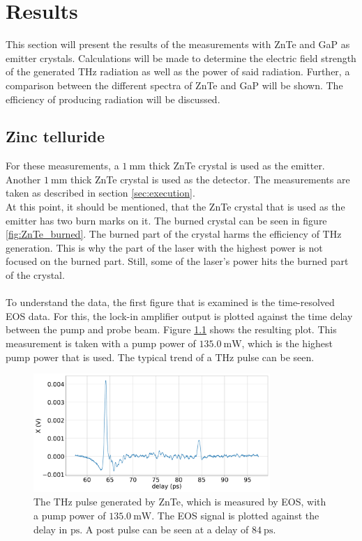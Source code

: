 \chapter{Results}
This section will present the results of the measurements with ZnTe and GaP as emitter crystals.
Calculations will be made to determine the electric field strength of the generated $\si{\tera\hertz}$ radiation as well as the power of said radiation.
Further, a comparison between the different spectra of ZnTe and GaP will be shown.
The efficiency of producing radiation will be discussed.

\section{Zinc telluride}
For these measurements, a $\SI{1}{\milli\meter}$ thick ZnTe crystal is used as the emitter.
Another $\SI{1}{\milli\meter}$ thick ZnTe crystal is used as the detector.
The measurements are taken as described in section \ref{sec:execution}.
\\
At this point, it should be mentioned, that the ZnTe crystal that is used as the emitter has two burn marks on it.
The burned crystal can be seen in figure \ref{fig:ZnTe_burned}.
The burned part of the crystal harms the efficiency of $\si{\tera\hertz}$ generation.
This is why the part of the laser with the highest power is not focused on the burned part.
Still, some of the laser's power hits the burned part of the crystal.
\\\\
To understand the data, the first figure that is examined is the time-resolved EOS data.
For this, the lock-in amplifier output is plotted against the time delay between the pump and probe beam.
Figure \ref{ZnTe:2_11_30_20_signal} shows the resulting plot.
This measurement is taken with a pump power of $\SI{135.0}{\milli\W}$, which is the highest pump power that is used.
The typical trend of a $\si{\tera\hertz}$ pulse can be seen.
\begin{figure}
    \centering
    \includegraphics[width=0.8\textwidth]{Plots/2_11_30_20normalX.pdf}
    \caption{The $\si{\tera\hertz}$ pulse generated by ZnTe, which is measured by EOS, with a pump power of $\SI{135.0}{\milli\W}$.
    The EOS signal is plotted against the delay in $\si{\pico\second}$.
    A post pulse can be seen at a delay of $\SI{84}{\pico\second}$.}
    \label{ZnTe:2_11_30_20_signal}
\end{figure}
